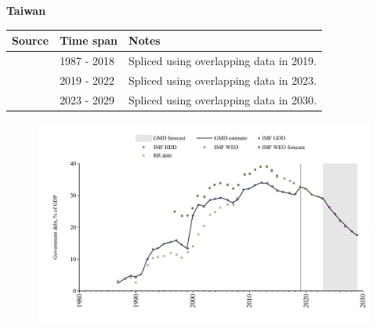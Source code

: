 \documentclass[12pt,a4paper,landscape]{article}
\begin{document}
\begin{adjustbox}{max totalsize={\paperwidth}{\paperheight},center}
\begin{minipage}[t][\textheight][t]{\textwidth}
\vspace*{0.5cm}
{}
\begin{center}
{\Large\bfseries Taiwan}
\end{center}
\vspace{0.5cm}
\begin{table}[H]
\centering
\small
\begin{tabular}{|l|l|l|}
\hline
\textbf{Source} & \textbf{Time span} & \textbf{Notes} \\
\hline
\rowcolor{white}\cite{IMF_GDD}& 1987 - 2018 &Spliced using overlapping data in 2019.\\
\rowcolor{lightgray}\cite{IMF_WEO}& 2019 - 2022 &Spliced using overlapping data in 2023.\\
\rowcolor{white}\cite{IMF_WEO_forecast}& 2023 - 2029 &Spliced using overlapping data in 2030.\\
\hline
\end{tabular}
\end{table}
\begin{figure}[H]
\centering
\includegraphics[width=\textwidth,height=0.6\textheight,keepaspectratio]{graphs/TWN_govdebt_GDP.pdf}
\end{figure}
\end{minipage}
\end{adjustbox}
\end{document}
